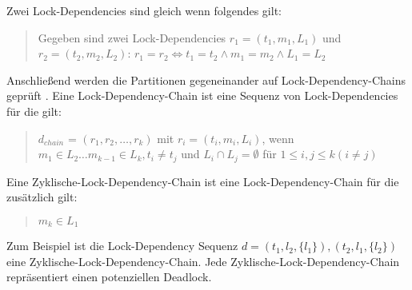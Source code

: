 Zwei Lock-Dependencies sind gleich wenn folgendes
gilt:\autocite[vgl.][8]{MagicLock}
\begin{quote}
  Gegeben sind zwei Lock-Dependencies \textrm{$r_1 = (t_1, m_1, L_1)$} und
  \textrm{$r_2 = (t_2, m_2, L_2)$}: $r_1 = r_2 \Leftrightarrow t_1 = t_2 \land
  m_1 = m_2 \land L_1 = L_2 $
\end{quote}
Anschließend werden die Partitionen gegeneinander auf Lock-Dependency-Chains
geprüft \autocite[vgl.][8]{MagicLock}. Eine Lock-Dependency-Chain ist eine
Sequenz von Lock-Dependencies für die gilt:\autocite[vgl.][3]{MagicLock}
\begin{quote}
  \textbf{$d_{chain}$} = $(r_1, r_2, \dots , r_k)$ mit $r_i = (t_i, m_i, L_i)$,
  wenn $m_1 \in L_2 \dots m_{k-1} \in L_k, t_i \neq t_j$ und $L_i \cap L_j =
  \emptyset$ für $1 \leq i, j \leq k (i \neq j)$
\end{quote}
Eine Zyklische-Lock-Dependency-Chain ist eine Lock-Dependency-Chain für die
zusätzlich gilt:\autocite[vgl.][3]{MagicLock}
\begin{quote}
  $m_k \in L_1$
\end{quote}
Zum Beispiel ist die Lock-Dependency Sequenz \textrm{$d = (t_1, l_2, \{l_1\}),
(t_2, l_1, \{l_2\})$} eine Zyklische-Lock-Dependency-Chain. Jede
Zyklische-Lock-Dependency-Chain repräsentiert einen potenziellen
Deadlock\autocite[vgl.][3]{MagicLock}.